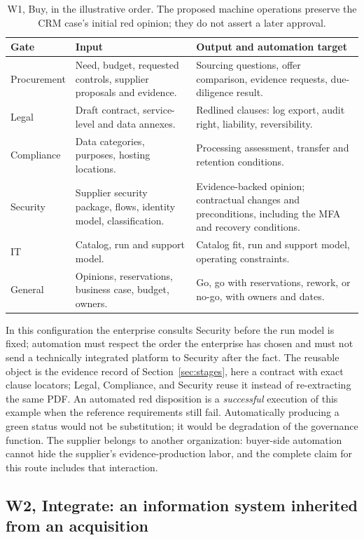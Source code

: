 \begin{table}[!htb]
\centering\small
\caption{W1, Buy, in the illustrative order. The proposed machine operations preserve the CRM case's
initial red opinion; they do not assert a later approval.}
\label{tab:w1}
\begin{tabularx}{\linewidth}{@{}P{2.7cm}LL@{}}
\toprule
Gate & Input & Output and automation target\\
\midrule
Procurement & Need, budget, requested controls, supplier proposals and evidence. & Sourcing questions,
offer comparison, evidence requests, due-diligence result.\\
Legal & Draft contract, service-level and data annexes. & Redlined clauses: log export, audit right,
liability, reversibility.\\
Compliance & Data categories, purposes, hosting locations. & Processing assessment, transfer and
retention conditions.\\
Security & Supplier security package, flows, identity model, classification. & Evidence-backed opinion;
contractual changes and preconditions, including the MFA and recovery conditions.\\
IT & Catalog, run and support model. & Catalog fit, run and support model, operating constraints.\\
General & Opinions, reservations, business case, budget, owners. & Go, go with reservations, rework, or
no-go, with owners and dates.\\
\bottomrule
\end{tabularx}
\end{table}

In this configuration the enterprise consults Security before the run model is fixed; automation must respect the order the enterprise has chosen and must not send a
technically integrated platform to Security after the fact. The reusable object is the evidence record of
Section~\ref{sec:stages}, here a contract with exact clause locators; Legal, Compliance, and Security
reuse it instead of re-extracting the same PDF. An automated red disposition is a \emph{successful}
execution of this example when the reference requirements still fail. Automatically producing a green
status would not be substitution; it would be degradation of the governance function. The supplier
belongs to another organization: buyer-side automation cannot hide the supplier's evidence-production
labor, and the complete claim for this route includes that interaction.

\subsection{W2, Integrate: an information system inherited from an acquisition}
\label{sec:cases-parameters}

